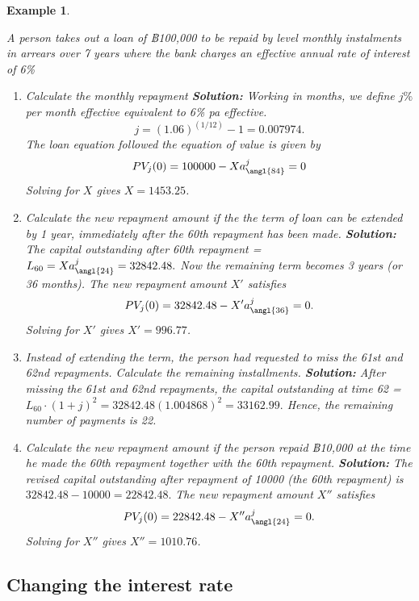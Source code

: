 \documentclass[landscape, 20pt]{extreport}
\theoremstyle{definition}
\theoremstyle{definition}
\newtheorem{example}{Example}[chapter]
\theoremstyle{definition}
\theoremstyle{definition}
\theoremstyle{remark}
\begin{document}
\newpage \begin{example}
\protect\hypertarget{exm:unlabeled-div-43}{}\label{exm:unlabeled-div-43}

\emph{A person takes out a loan of ฿100,000 to be repaid by
level monthly instalments in arrears over 7 years where the bank charges
an effective annual rate of interest of 6\%}

\begin{enumerate}
\def\labelenumi{\arabic{enumi}.}
\item
  \emph{Calculate the monthly repayment \textbf{Solution:} Working in months, we
  define \(j\%\) per month effective equivalent to 6\% pa effective.
  \[j = (1.06)^{(1/12)} - 1 = 0.007974.\] The loan equation followed
  the equation of value is given by
  \[PV_j(0) = 100000 - X a^j_{\angl{84}} = 0\] Solving for \(X\) gives
  \(X =1453.25\).}
\item
  \emph{Calculate the new repayment amount if the the term of loan can be
  extended by 1 year, immediately after the 60th repayment has been
  made. \textbf{Solution:} The capital outstanding after 60th repayment =
  \(L_{60} = X a^j_{\angl{24}} = 32842.48.\) Now the remaining term
  becomes 3 years (or 36 months). The new repayment amount \(X'\)
  satisfies \[PV_j(0) = 32842.48 - X' a^j_{\angl{36}} = 0.\] Solving
  for \(X'\) gives \(X' = 996.77\).}
\item
  \emph{Instead of extending the term, the person had requested to miss the
  61st and 62nd repayments. Calculate the remaining installments.
  \textbf{Solution:} After missing the 61st and 62nd repayments, the
  capital outstanding at time 62 =
  \(L_{60}\cdot (1+j)^2 = 32842.48 (1.004868)^2 = 33162.99.\) Hence, the
  remaining number of payments is 22.}
\item
  \emph{Calculate the new repayment amount if the person repaid ฿10,000 at
  the time he made the 60th repayment together with the 60th
  repayment. \textbf{Solution:} The revised capital outstanding after
  repayment of 10000 (the 60th repayment) is
  \(32842.48 - 10000 = 22842.48.\) The new repayment amount \(X''\)
  satisfies \[PV_j(0) = 22842.48 - X'' a^j_{\angl{24}} = 0.\] Solving
  for \(X''\) gives \(X'' = 1010.76\).}
\end{enumerate}

\end{example}

\hypertarget{changing-the-interest-rate}{%
\subsection{Changing the interest rate}\label{changing-the-interest-rate}}
\end{document}

